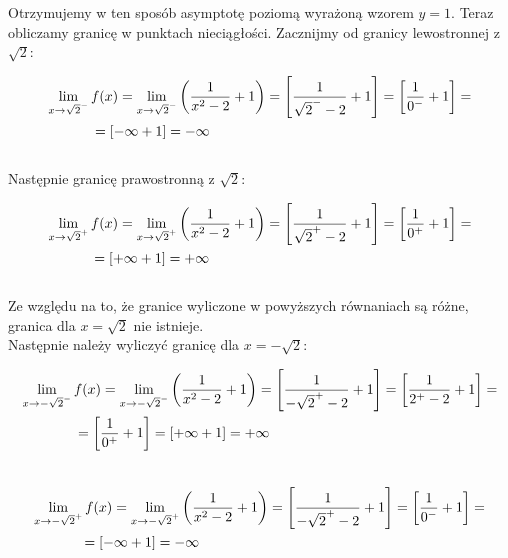 \documentclass[10pt]{article}
\begin{document}
\noindent Otrzymujemy w ten sposób asymptotę poziomą wyrażoną wzorem $y=1$. Teraz obliczamy granicę w punktach nieciągłości. Zacznijmy od granicy lewostronnej z $\sqrt{2}$:

{\large \begin{eqnarray}
\lim_{x\to\sqrt{2}^-}f(x) = \lim_{x\to\sqrt{2}^-} \left( \frac{1}{x^2 - 2} +1 \right) = \left[ \frac{1}{\sqrt{2}^- -2} + 1 \right] = \left[ \frac{1}{0^-} + 1 \right] = \\ = [-\infty +1] = -\infty \phantom{\hspace{6.6cm}} \nonumber
\end{eqnarray}} \\

\noindent Następnie granicę prawostronną z $\sqrt{2}$:

{\large \begin{eqnarray}
\lim_{x\to\sqrt{2}^+}f(x) = \lim_{x\to\sqrt{2}^+} \left( \frac{1}{x^2 - 2} +1 \right) = \left[ \frac{1}{\sqrt{2}^+ -2} + 1 \right] = \left[ \frac{1}{0^+} + 1 \right] = \\ = [+\infty +1] = +\infty \phantom{\hspace{6.6cm}} \nonumber
\end{eqnarray}} \\

\noindent Ze względu na to, że granice wyliczone w powyższych równaniach są różne, granica dla $x = \sqrt{2}$ nie istnieje. \\
Następnie należy wyliczyć granicę dla $x=-\sqrt{2}$:

{\large \begin{eqnarray}
\lim_{x\to -\sqrt{2}^-}f(x) = \lim_{x\to -\sqrt{2}^-} \left( \frac{1}{x^2 - 2} +1 \right) = \left[ \frac{1}{ -\sqrt{2}^+ -2} + 1 \right] = \left[ \frac{1}{ 2^+ -2} + 1 \right] =  \\ = \left[ \frac{1}{0^+} + 1 \right] = [+\infty +1] = +\infty \phantom{\hspace{5.75cm}}
\end{eqnarray}} \\

{\large \begin{eqnarray}
\lim_{x\to -\sqrt{2}^+}f(x) = \lim_{x\to -\sqrt{2}^+} \left( \frac{1}{x^2 - 2} +1 \right) = \left[ \frac{1}{ -\sqrt{2}^+ -2} + 1 \right] = \left[ \frac{1}{0^-} + 1 \right] = \\ = [-\infty +1] = -\infty \phantom{\hspace{7.2cm}} \nonumber
\end{eqnarray}} \\
\end{document}
